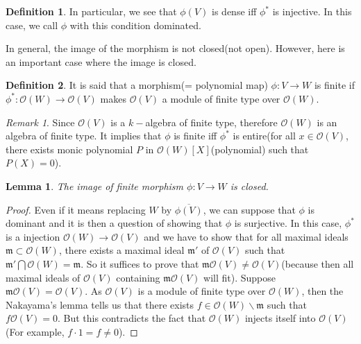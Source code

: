 \documentclass[12pt,a4paper,english]{article}
\theoremstyle{plain}
\newtheorem{lem}[thm]{Lemma}
\theoremstyle{definition}
\newtheorem{defi}{Definition}
\theoremstyle{remark}
\newtheorem*{rem}{Remark}
\begin{document}
\begin{defi}
In particular, we see that $\phi(V)$ is dense iff $\phi^{*}$ is injective. In this case, we call $\phi$ with this condition dominated. 
\end{defi}

In general, the image of the morphism is not closed(not open). However, here is an important case where the image is closed.

\begin{defi}
It is said that a morphism(= polynomial map) $\phi: V\rightarrow W$ is finite if $\phi^{*}:\mathcal{O}(W)\rightarrow \mathcal{O}(V)$ makes $\mathcal{O}(V)$ a module of finite type over $\mathcal{O}(W)$.  
\end{defi}
\begin{rem}
Since $\mathcal{O}(V)$ is a $k-$algebra of finite type, therefore $\mathcal{O}(W)$ is an algebra of finite type. It implies that $\phi$ is finite iff $\phi^{*}$ is entire(for all $x\in \mathcal{O}(V)$, there exists monic polynomial $P$ in $\mathcal{O}(W)[X]$(polynomial) such that $P(X)=0$).
\end{rem}

\begin{lem}
The image of finite morphism $\phi: V\rightarrow W$ is closed.
\end{lem}
\begin{proof}
Even if it means replacing $W$ by $\overline{\phi(V)}$, we can suppose that $\phi$ is dominant and it is then a question of showing that $\phi$ is surjective. In this case, $\phi^{*}$ is a injection $\mathcal{O}(W)\rightarrow\mathcal{O}(V)$ and we have to show that for all maximal ideals $\mathfrak{m}\subset \mathcal{O}(W)$, there exists a maximal ideal $\mathfrak{m'}$ of $\mathcal{O}(V)$ such that $\mathfrak{m'}\bigcap \mathcal{O}(W)=\mathfrak{m}$. So it suffices to prove that  $\mathfrak{m}\mathcal{O}(V)\not=\mathcal{O}(V)$(because then all maximal ideals of $\mathcal{O}(V)$ containing $\mathfrak{m}\mathcal{O}(V)$ will fit).  Suppose $\mathfrak{m}\mathcal{O}(V)=\mathcal{O}(V)$. As $\mathcal{O}(V)$ is a module of finite type over $\mathcal{O}(W)$, then the Nakayama's lemma tells us that there exists $f\in \mathcal{O}(W)\backslash \mathfrak{m}$ such that $f\mathcal{O}(V)=0$. But this contradicts the fact that $\mathcal{O}(W)$ injects itself into $\mathcal{O}(V)$ (For example, $f\cdot 1=f\not=0$).  
\end{proof}
\end{document}
